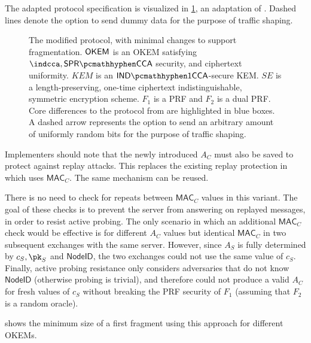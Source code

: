 The adapted protocol specification is visualized in \cref{fig:modified-drivel-minimal}, an adaptation of \cite[Figure~6]{EPRINT:GRSV25}. Dashed lines denote the option to send dummy data for the purpose of traffic shaping.

\begin{figure}
    
    \caption[
        The modified \drivel{} protocol, with minimal changes to support fragmentation.
    ]{
        The modified \drivel{} protocol, with minimal changes to support fragmentation.
        $\mathsf{OKEM}$ is an OKEM satisfying $\indcca, \sprcca$ security, and ciphertext uniformity.
        $KEM$ is an $\indonecca$-secure KEM.
        $SE$ is a length-preserving, one-time ciphertext indistinguishable, symmetric encryption scheme.
        $F_1$ is a PRF and $F_2$ is a dual PRF.
        Core differences to the \drivel{} protocol from \cite[Figure~6]{EPRINT:GRSV25} are highlighted in blue boxes.
        A dashed arrow represents the option to send an arbitrary amount of uniformly random bits for the purpose of traffic shaping.
    }
    \label{fig:modified-drivel-minimal}
\end{figure}

Implementers should note that the newly introduced $A_C$ must also be saved to protect against replay attacks. This replaces the existing replay protection in \obfsfour{} which uses $\mathsf{MAC}_C$. The same mechanism can be reused.

There is no need to check for repeats between $\mathsf{MAC}_C$ values in this variant. The goal of these checks is to prevent the server from answering on replayed messages, in order to resist active probing.
The only scenario in which an additional $\mathsf{MAC}_C$ check would be effective is for different $A_C$ values but identical $\mathsf{MAC}_C$ in two subsequent exchanges with the same server. However, since $A_S$ is fully determined by $c_S, \pk_S$ and $\mathsf{NodeID}$, the two exchanges could not use the same value of $c_S$.
Finally, active probing resistance only considers adversaries that do not know $\mathsf{NodeID}$ (otherwise probing is trivial), and therefore could not produce a valid $A_C$ for fresh values of $c_S$ without breaking the PRF security of $F_1$ (assuming that $F_2$ is a random oracle).

 shows the minimum size of a first fragment using this approach for different OKEMs.

